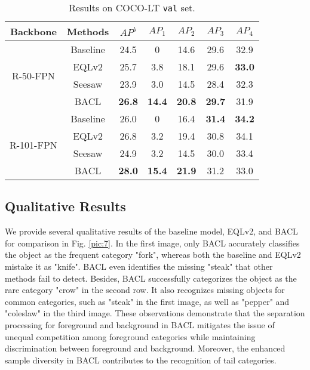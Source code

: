 \documentclass[lettersize,journal]{IEEEtran}
\begin{document}
\begin{table}[t]
    \centering
    \caption{Results on COCO-LT \texttt{val} set.}
    \begin{tabular}{c|c|c|cccc}
        \toprule
        Backbone                        & Methods & $AP^b$   & $AP_1$   & $AP_2$   & $AP_3$   & $AP_4$   \\ \midrule
        \multirow{4}{*}{R-50-FPN}  & Baseline    & 24.5 & 0 & 14.6 & 29.6 & 32.9  \\
                                        & EQLv2    & 25.7 & 3.8 & 18.1 & 29.6 & \textbf{33.0}  \\
                                        & Seesaw    & 23.9 & 3.0 & 14.5 & 28.4 & 32.3  \\
                                        & BACL    & \textbf{26.8} & \textbf{14.4} & \textbf{20.8} & \textbf{29.7} & 31.9  \\ \midrule
        \multirow{4}{*}{R-101-FPN} & Baseline    &   26.0    &    0   &   16.4    &    \textbf{31.4}   &  \textbf{34.2}     \\
                                        & EQLv2    & 26.8 & 3.2 & 19.4 & 30.8 & 34.1  \\
                                        & Seesaw    & 24.9 & 3.2 & 14.5 & 30.0 & 33.4  \\
                                        & BACL    & \textbf{28.0} & \textbf{15.4} & \textbf{21.9} & 31.2 & 33.0  \\ \bottomrule
        \end{tabular}
    \label{tab:cocolt}
    \vspace{-3mm}
\end{table}

\subsection{Qualitative Results}
We provide several qualitative results of the baseline model, EQLv2, and BACL for comparison in Fig. \ref{pic:7}.
In the first image, only BACL accurately classifies the object as the frequent category "fork", whereas both the baseline and EQLv2 mistake it as "knife".
BACL even identifies the missing "steak" that other methods fail to detect.
Besides, BACL successfully categorizes the object as the rare category "crow" in the second row.
It also recognizes missing objects for common categories, such as "steak" in the first image, as well as "pepper" and "coleslaw" in the third image.
These observations demonstrate that the separation processing for foreground and background in BACL mitigates the issue of unequal competition among foreground categories while maintaining discrimination between foreground and background.
Moreover, the enhanced sample diversity in BACL contributes to the recognition of tail categories.
\end{document}
